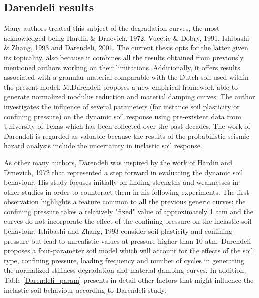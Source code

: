 \documentclass[11pt,a4paper]{report}
\begin{document}
\subsection{Darendeli results}
Many authors treated this subject of the degradation curves, the most acknowledged being Hardin \& Drnevich, 1972, Vucetic \& Dobry, 1991\cite{dobry1988dynamic}, Ishibashi \& Zhang, 1993 \cite{ishibashi1993unified} and Darendeli, 2001\cite{darendeli2001development}. The current thesis opts for the latter given its topicality, also because it combines all the results obtained from previously mentioned authors working on their limitations. Additionally, it offers results associated with a granular material comparable with the Dutch soil used within the present model.
M.Darendeli proposes a new empirical framework able to generate normalized modulus reduction and material damping curves. The author investigates the influence of several parameters (for instance soil plasticity or confining pressure) on the dynamic soil response using pre-existent data from University of Texas which has been collected over the past decades. The work of Darendeli is regarded as valuable because the results of the probabilistic seismic hazard analysis include the uncertainty in inelastic soil response.
 
As other many authors, Darendeli was inspired by the work of Hardin and Drnevich, 1972\cite{hardin1972shear} that represented a step forward in evaluating the dynamic soil behaviour. His study focuses initially on finding strengths and weaknesses in other studies in order to counteract them in his following experiments. The first observation highlights a feature common to all the previous generic curves: the confining pressure takes a relatively "fixed" value of approximately 1 atm and the curves do not incorporate the effect of the confining pressure on the inelastic soil behaviour. Ishibashi and Zhang, 1993 \cite{ishibashi1993unified} consider soil plasticity and confining pressure but lead to unrealistic values at pressure higher than 10 atm. Darendeli proposes a four-parameter soil model which will account for the effects of the soil type, confining pressure, loading frequency and number of cycles in generating the normalized stiffness degradation and material damping curves. In addition, Table \ref{Darendeli_param} presents in detail other factors that might influence the inelastic soil behaviour according to Darendeli study.
\end{document}
